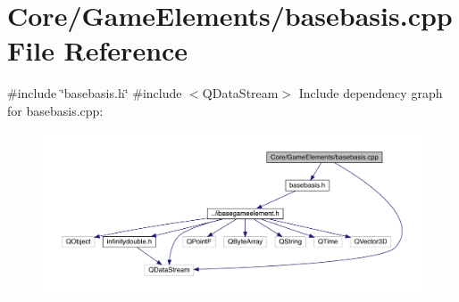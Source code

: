 \hypertarget{a00026}{}\section{Core/\+Game\+Elements/basebasis.cpp File Reference}
\label{a00026}
{\ttfamily \#include \char`\"{}basebasis.\+h\char`\"{}}\newline
{\ttfamily \#include $<$Q\+Data\+Stream$>$}\newline
Include dependency graph for basebasis.\+cpp\+:
\nopagebreak
\begin{figure}[H]
\begin{center}
\leavevmode
\includegraphics[width=350pt]{d0/d33/a00027}
\end{center}
\end{figure}
